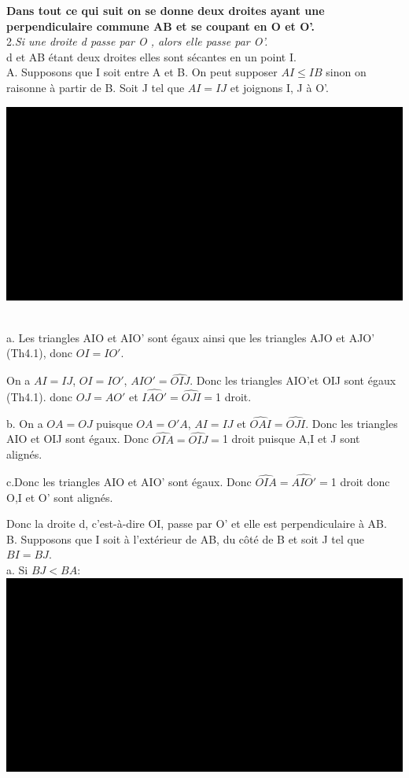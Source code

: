 \documentclass[a4paper, 12pt, twoside]{book}
\begin{document}
  \textbf{Dans tout ce qui suit on se donne deux droites ayant une perpendiculaire commune AB et se coupant en O et O'.}\\
  
  
  2.\textit{Si une droite d passe par O , alors elle passe par O'.}\\
  
 d et AB étant deux droites elles sont sécantes en un point I.\\
 
 A. Supposons que I soit entre A et B. On peut supposer $AI\leq IB$ sinon on raisonne à partir de B. Soit J tel que $AI=IJ$ et joignons I, J à O'.\
 
 
  \includegraphics[scale=0.7]{figures/sacc21.eps} \
  
  a. Les triangles AIO et AIO' sont égaux ainsi que les triangles AJO et AJO' (Th4.1), donc $OI=IO'$.\
  
   On a $AI=IJ$, $OI=IO'$, $\hat{AIO'}=\hat{OIJ}$. Donc les triangles AIO'et OIJ sont égaux (Th4.1). donc $OJ=AO'$ et $\hat{IAO'}=\hat{OJI}=$1 droit.\
  
  
 b. On a $OA=OJ$ puisque $OA=O'A$, $AI=IJ$ et $\hat{OAI}=\hat{OJI}$. Donc les triangles AIO et OIJ sont égaux. Donc  $\hat{OIA}=\hat{OIJ}=$1 droit puisque A,I et J sont alignés.\
 
 c.Donc les triangles AIO et AIO' sont égaux. Donc  $\hat{OIA}=\hat{AIO'}=$1 droit donc O,I et O' sont alignés.\
 
 Donc la droite d, c'est-à-dire OI, passe par O' et elle est perpendiculaire à AB.\\
 
 B. Supposons que I soit à l'extérieur de AB, du côté de B et soit J tel que $BI=BJ$.\\
 
a. Si $BJ<BA$:\\

 
  \includegraphics[scale=0.5]{figures/sacc22.eps} \ 
  
\end{document}
